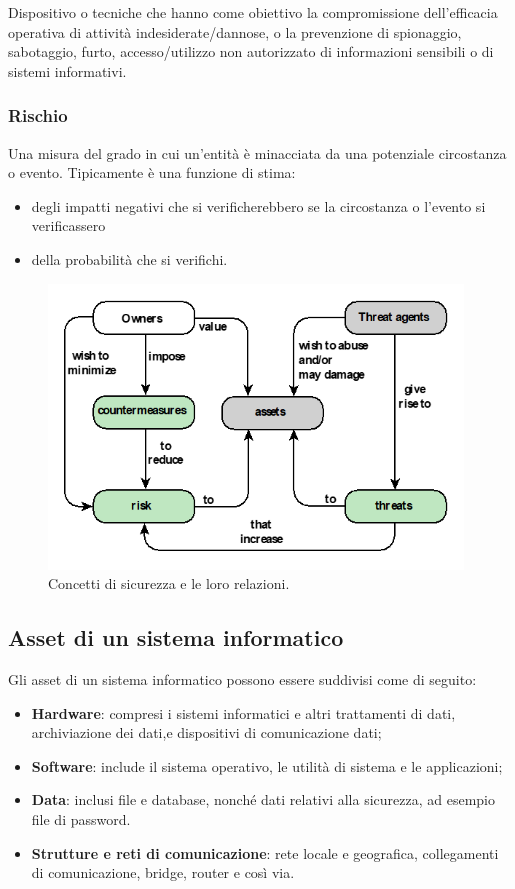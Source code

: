 Dispositivo o tecniche che hanno come obiettivo la compromissione dell'efficacia
operativa di attività indesiderate/dannose, o la prevenzione di spionaggio,
sabotaggio, furto, accesso/utilizzo non autorizzato di informazioni
sensibili o di sistemi informativi.

\subsubsection{Rischio}

Una misura del grado in cui un'entità è minacciata da una potenziale circostanza o
evento. Tipicamente è una funzione di stima:

\begin{itemize}
    \item degli impatti negativi che si verificherebbero se la circostanza o
          l'evento si verificassero
    \item della probabilità che si verifichi.
\end{itemize}

\begin{figure}[H]
    \centering
    \includegraphics[width=11cm, keepaspectratio]{capitoli/cap_1/imgs/relazione_concetti_sicurezza.png}
    \caption{Concetti di sicurezza e le loro relazioni.}\label{fig:relazioni_concetti_sec}
\end{figure}

\subsection{Asset di un sistema informatico}

Gli asset di un sistema informatico possono essere suddivisi come di seguito:
\begin{itemize}
    \item \textbf{Hardware}: compresi i sistemi informatici e altri trattamenti di dati, archiviazione dei dati,e dispositivi di comunicazione dati;
    \item \textbf{Software}: include il sistema operativo, le utilità di sistema e le applicazioni;
    \item \textbf{Data}: inclusi file e database, nonché dati relativi alla sicurezza, ad esempio file di password.
    \item \textbf{Strutture e reti di comunicazione}: rete locale e geografica, collegamenti di comunicazione, bridge, router e così via.
\end{itemize}

